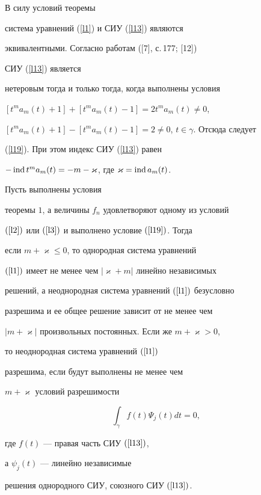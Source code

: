 \begin{pf}


В силу условий теоремы


система уравнений (\ref{l1}) и СИУ (\ref{l13}) являются


эквивалентными. Согласно работам ([7], с.\,177; [12])


СИУ (\ref{l13}) является


нетеровым тогда и только тогда, когда выполнены условия


$[t^ma_m(t)+1]+[t^ma_m(t)-1]=2t^ma_m(t)\ne0$,


$[t^ma_m(t)+1]-[t^ma_m(t)-1]=2\ne0$, $t\in\gamma$. Отсюда следует


(\ref{l19}). При этом индекс СИУ (\ref{l13}) равен


$-\operatorname{ind} t^ma_m(t)=-m-\varkappa$, где $\varkappa=\operatorname{ind} a_m(t)$.


\end{pf}








\begin{thm}


Пусть выполнены условия


теоремы $1$, а величины $f_n$ удовлетворяют одному из условий


$(\ref{l2})$ или $(\ref{l3})$ и выполнено условие $(\ref{l19})$. Тогда


если $m+\varkappa\leqslant0$, то однородная система уравнений


$(\ref{l1})$ имеет не менее чем $|\varkappa+m|$ линейно независимых


решений, а неоднородная система уравнений $(\ref{l1})$ безусловно


разрешима и ее общее решение зависит от не менее чем


$|m+\varkappa|$ произвольных постоянных. Если же $m+\varkappa>0$,


то неоднородная система уравнений $(\ref{l1})$


разрешима, если будут выполнены не менее чем


$m+\varkappa$ условий разрешимости


\begin{equation}


\label{l20}


\int_\gamma f(t) \Psi_j(t)dt=0,


\end{equation}


где $f(t)$ --- правая часть СИУ $(\ref{l13})$,


а $\psi_j(t)$ --- линейно независимые


решения однородного СИУ, союзного СИУ $(\ref{l13})$.


\end{thm}








